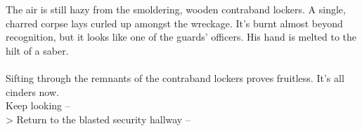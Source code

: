 The air is still hazy from the smoldering, wooden contraband lockers. A single, charred corpse lays curled up amongst the wreckage. It's burnt almost beyond recognition, but it looks like one of the guards’ officers. His hand is melted to the hilt of a saber.\\
\\

Sifting through the remnants of the contraband lockers proves fruitless. It's all cinders now.\\

 Keep looking -- \\
> Return to the blasted security hallway -- 